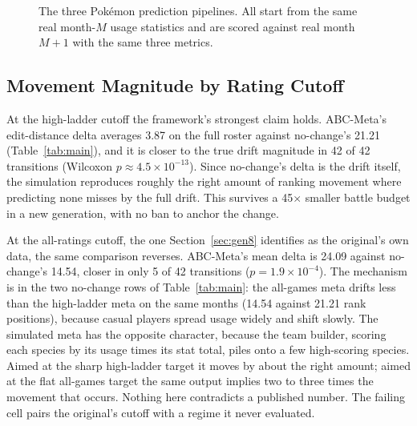 \documentclass[journal]{IEEEtran}
\newcommand{\pkmn}{Pok\'emon}
\begin{document}
\begin{figure}[t]
{%
}
\caption{The three \pkmn{} prediction pipelines. All start from the same
real month-$M$ usage statistics and are scored against real month $M{+}1$
with the same three metrics.}
\label{fig:pipelines}
\end{figure}

\subsection{Movement Magnitude by Rating Cutoff}
\label{sec:r0}

At the high-ladder cutoff the framework's strongest claim holds.
ABC-Meta's edit-distance delta averages 3.87 on the full roster against
no-change's 21.21 (Table~\ref{tab:main}), and it is closer to the true
drift magnitude in 42 of 42 transitions (Wilcoxon $p\approx4.5\times
10^{-13}$). Since no-change's delta is the drift itself, the simulation
reproduces roughly the right amount of ranking movement where predicting
none misses by the full drift. This survives a 45$\times$ smaller battle budget in a new generation, with no ban to anchor the change.

At the all-ratings cutoff, the one Section~\ref{sec:gen8} identifies as
the original's own data, the same comparison reverses. ABC-Meta's mean
delta is 24.09 against no-change's 14.54, closer in only 5 of 42
transitions ($p=1.9\times10^{-4}$). The mechanism is in the two
no-change rows of Table~\ref{tab:main}: the all-games meta drifts less
than the high-ladder meta on the same months (14.54 against 21.21 rank
positions), because casual players spread usage widely and shift slowly.
The simulated meta has the opposite character, because the team builder,
scoring each species by its usage times its stat total, piles onto a few
high-scoring species.
Aimed at the sharp high-ladder target it moves by about the right amount;
aimed at the flat all-games target the same output implies two to three
times the movement that occurs. Nothing here contradicts a published
number. The failing cell pairs the original's cutoff with a regime it
never evaluated.
\end{document}
